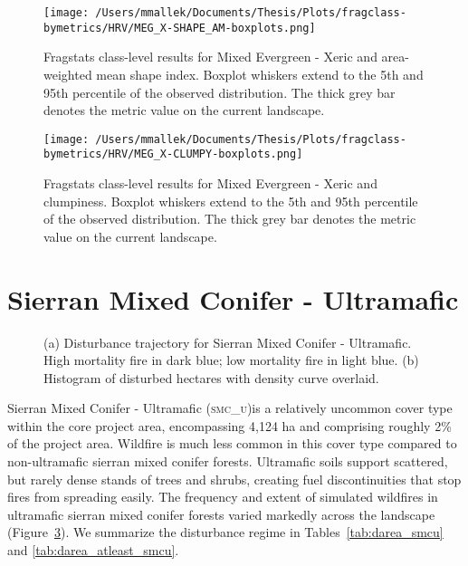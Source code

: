 \begin{figure}[!htbp]
\centering
    \texttt{[image: /Users/mmallek/Documents/Thesis/Plots/fragclass-bymetrics/HRV/MEG\_X-SHAPE\_AM-boxplots.png]}
  \caption{Fragstats class-level results for Mixed Evergreen - Xeric and area-weighted mean shape index. Boxplot whiskers extend to the 5th and 95th percentile of the observed distribution. The thick grey bar denotes the metric value on the current landscape.}
  \label{fig:megx_shapeam}
\end{figure}


\begin{figure}[!htbp]
\centering
    \texttt{[image: /Users/mmallek/Documents/Thesis/Plots/fragclass-bymetrics/HRV/MEG\_X-CLUMPY-boxplots.png]}
  \caption{Fragstats class-level results for Mixed Evergreen - Xeric and clumpiness. Boxplot whiskers extend to the 5th and 95th percentile of the observed distribution. The thick grey bar denotes the metric value on the current landscape.}
  \label{fig:megx_clumpy}
\end{figure}


\clearpage
\section{Sierran Mixed Conifer - Ultramafic} 
\begin{figure}[!htbp]
  \centering
  \caption{\small (a) Disturbance trajectory for Sierran Mixed Conifer - Ultramafic. High mortality fire in dark blue; low mortality fire in light blue. (b) Histogram of disturbed hectares with density curve overlaid.} 
  \label{fig:darea_smcu}
\end{figure}

Sierran Mixed Conifer - Ultramafic (\textsc{smc\_u})is a relatively uncommon cover type within the core project area, encompassing 4,124 ha and comprising roughly 2\% of the project area. Wildfire is much less common in this cover type compared to non-ultramafic sierran mixed conifer forests. Ultramafic soils support scattered, but rarely dense stands of trees and shrubs, creating fuel discontinuities that stop fires from spreading easily. The frequency and extent of simulated wildfires in ultramafic sierran mixed conifer forests varied markedly across the landscape (Figure~\ref{fig:darea_smcu}).  We summarize the disturbance regime in Tables~\ref{tab:darea_smcu} and \ref{tab:darea_atleast_smcu}.

